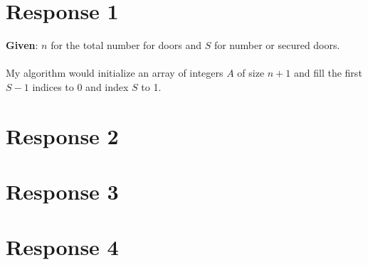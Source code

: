 \documentclass[12pt, a4paper]{article}
\begin{document}
\maketitle
\section*{\centering Response 1}
\textbf{Given}: \(n\) for the total number for doors and \(S\) for number or secured doors.
\\
\\
My algorithm would initialize an array of integers \(A\) of size \(n + 1\) and fill the first \(S-1\) indices to 0 and index \(S\) to 1.
\newpage
\section*{\centering Response 2}
\newpage
\section*{\centering Response 3}
\newpage
\section*{\centering Response 4}
\end{document}
